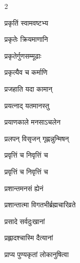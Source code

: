 \begin{multicols}{2}
\begin{indexlist}
\item प्रकृतिं स्वामवष्टभ्य \dotfill {}
\item प्रकृतेः क्रियमाणानि \dotfill {}
\item प्रकृतेर्गुणसम्मूढाः \dotfill {}
\item प्रकृत्यैव च कर्माणि \dotfill {}
\item प्रजहाति यदा कामान् \dotfill {}
\item प्रयत्नाद् यतमानस्तु \dotfill {}
\item प्रयाणकाले मनसाऽचलेन \dotfill {}
\item प्रलपन् विसृजन् गृह्णन्नुन्मिषन् \dotfill {}
\item प्रवृत्तिं च निवृत्तिं च \dotfill {}
\item प्रवृत्तिं च निवृत्तिं च \dotfill {}
\item प्रशान्तमनसं ह्येनं \dotfill {}
\item प्रशान्तात्मा विगतभीर्ब्रह्मचारिव्रते \dotfill {}
\item प्रसादे सर्वदुःखानां \dotfill {}
\item प्रह्लादश्चास्मि दैत्यानां \dotfill {}
\item प्राप्य पुण्यकृतां लोकानुषित्वा \dotfill {}
\end{indexlist}


\end{multicols}
